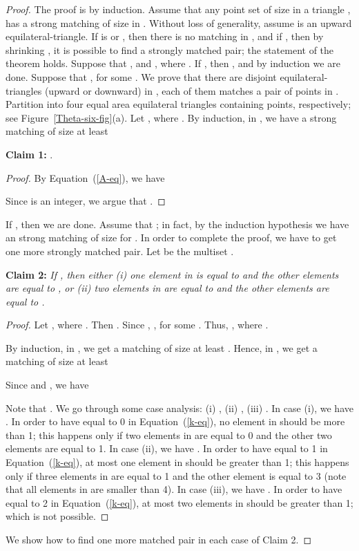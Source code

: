 \documentclass[11pt,a4paper]{article}
\begin{document}
\begin{proof}
The proof is by induction. Assume that any point set of size  in a triangle , has a strong matching of size  in . Without loss of generality, assume  is an upward equilateral-triangle. If  is  or , then there is no matching in , and if , then by shrinking , it is possible to find a strongly matched pair; the statement of the theorem holds. Suppose that , and , where . If , then 
, and by
induction we are done. Suppose that , for some . We prove that there are  disjoint equilateral-triangles (upward or downward) in ,
each of them matches a pair of points in . Partition  into four equal area equilateral triangles  containing  points, respectively; see Figure~\ref{Theta-six-fig}(a). Let , where . 
By induction, in , we have a strong matching of size at least


{\bf Claim 1:} .
\begin{proof}
By Equation~(\ref{A-eq}), we have

Since  is an integer, we argue that .
\end{proof}

If , then we are done. Assume that ; in fact, by the induction hypothesis we have an strong matching of size  for . In order to complete the proof, we have to get one more strongly matched pair. Let  be the multiset .


{\bf Claim 2:} {\em If , then either (i) one element in  is equal to  and the other elements are equal to , or (ii) two elements in  are equal to  and the other elements are equal to .}
\begin{proof}
Let , where . Then . Since , , for some . Thus, , where .

By induction, in , we get a matching of size at least . Hence, in , we get a matching of size at least



Since  and , we have 



Note that .
We go through some case analysis: (i) , (ii) , (iii) . In case (i), we have . In order to have  equal to 0 in Equation~(\ref{k-eq}), no element in  should be more than 1; this happens only if two elements in  are equal to 0 and the other two elements are equal to 1. In case (ii), we have . In order to have  equal to 1 in Equation~(\ref{k-eq}), at most one element in  should be greater than 1; this happens only if three elements in  are equal to 1 and the other element is equal to 3 (note that all elements in  are smaller than 4). In case (iii), we have . In order to have  equal to 2 in Equation~(\ref{k-eq}), at most two elements in  should be greater than 1; which is not possible.
\end{proof} 
We show how to find one more matched pair in each case of Claim 2.



\end{proof}
\end{document}
